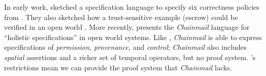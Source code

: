 In early work, 
\cite{WAS-OOPSLA14-TR} %
sketched a  specification language to
specify six correctness policies from \cite{MillerPhD}. %
They also
  sketched how 
a trust-sensitive 
example (escrow) could be verified in an open world
\cite{swapsies}. More recently, 
\cite{FASE} presents the \emph{Chainmail} language for
``holistic specifications'' in open world systems.
Like \Nec, \emph{Chainmail} is able to express specifications of
\emph{permission}, \emph{provenance}, and \emph{control}; \emph{Chainmail}
also includes \emph{spatial} assertions and a richer set of temporal
operators, but no proof system. 
\Nec's restrictions mean 
we can provide the proof system that \emph{Chainmail} lacks.






